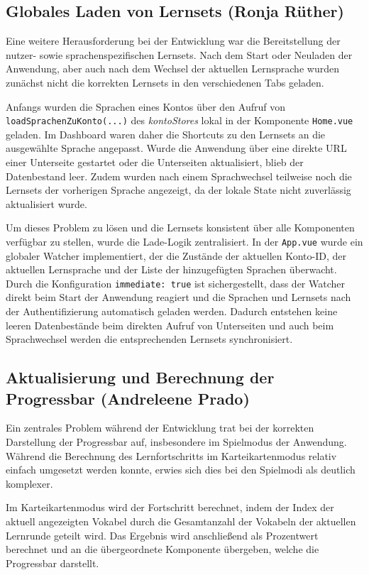 \subsection{Globales Laden von Lernsets (Ronja Rüther)}
Eine weitere Herausforderung bei der Entwicklung war die Bereitstellung der nutzer- sowie sprachenspezifischen Lernsets. Nach dem Start oder Neuladen der Anwendung, aber auch nach dem Wechsel der aktuellen Lernsprache wurden 
zunächst nicht die korrekten Lernsets in den verschiedenen Tabs geladen.

Anfangs wurden die Sprachen eines Kontos über den Aufruf von \texttt{loadSprachenZuKonto(...)} des \textit{kontoStores} lokal in der Komponente \texttt{Home.vue} geladen. 
Im Dashboard waren daher die Shortcuts zu den Lernsets an die ausgewählte Sprache angepasst. 
Wurde die Anwendung über eine direkte URL einer Unterseite gestartet oder die Unterseiten aktualisiert, blieb der Datenbestand leer. 
Zudem wurden nach einem Sprachwechsel teilweise noch die Lernsets der vorherigen Sprache angezeigt, da der lokale State nicht zuverlässig aktualisiert wurde.

Um dieses Problem zu lösen und die Lernsets konsistent über alle Komponenten verfügbar zu stellen, wurde die Lade-Logik zentralisiert. 
In der \texttt{App.vue} wurde ein globaler Watcher implementiert, der die Zustände der aktuellen Konto-ID, der aktuellen Lernsprache und der Liste der hinzugefügten Sprachen überwacht. 
Durch die Konfiguration \texttt{immediate: true} ist sichergestellt, dass der Watcher direkt beim Start der Anwendung reagiert und die Sprachen und Lernsets nach der Authentifizierung 
automatisch geladen werden. 
Dadurch entstehen keine leeren Datenbestände beim direkten Aufruf von Unterseiten und auch beim Sprachwechsel werden die entsprechenden Lernsets synchronisiert.

\subsection{Aktualisierung und Berechnung der Progressbar (Andreleene Prado)}
Ein zentrales Problem während der Entwicklung trat bei der korrekten Darstellung der Progressbar auf, insbesondere im Spielmodus der Anwendung. 
Während die Berechnung des Lernfortschritts im Karteikartenmodus relativ einfach umgesetzt werden konnte, erwies sich dies bei den Spielmodi als deutlich komplexer.

Im Karteikartenmodus wird der Fortschritt berechnet, indem der Index der aktuell angezeigten Vokabel durch die Gesamtanzahl der Vokabeln der aktuellen Lernrunde geteilt wird. 
Das Ergebnis wird anschließend als Prozentwert berechnet und an die übergeordnete Komponente übergeben, welche die Progressbar darstellt.

